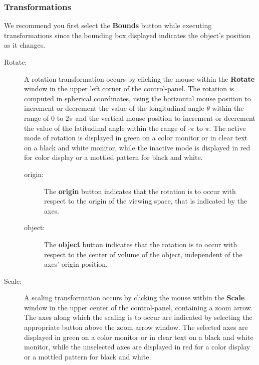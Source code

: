 \subsubsection{Transformations}

We recommend you first select the {\bf Bounds} button while
executing transformations since the bounding box displayed
indicates the object's position as it changes.
%
\begin{description}
%
\item[Rotate:]  A rotation transformation occurs by clicking the mouse
within the {\bf Rotate} window in the upper left corner of the
control-panel.
The rotation is computed in spherical coordinates, using the
horizontal mouse position to increment or decrement the value of
the longitudinal angle $\theta$ within the
range of 0 to 2$\pi$ and the vertical mouse position
to increment or decrement the value of the latitudinal angle
 within the range of -$\pi$
to $\pi$.
The active mode of rotation is displayed in green on a color
monitor or in clear text on a black and white monitor, while the
inactive mode is displayed in red for color display or a mottled
pattern for black and white.
%
\begin{description}
%
\item[origin:]  The {\bf origin} button indicates that the
rotation is to occur with respect to the origin of the viewing space, that is
indicated by the axes.
%
\item[object:]  The {\bf object} button indicates that the
rotation is to occur with respect to the center of volume of the object,
independent of the axes' origin position.
\end{description}
%
\item[Scale:]  A scaling transformation occurs by clicking the mouse
within the {\bf Scale} window in the upper center of the
control-panel, containing a zoom arrow.
The axes along which the scaling is to occur are indicated by
selecting the appropriate button above the zoom arrow window.
The selected axes are displayed in green on a color monitor or in
clear text on a black and white monitor, while the unselected axes
are displayed in red for a color display or a mottled pattern for
black and white.
%
\begin{description}

\end{description}
\end{description}
